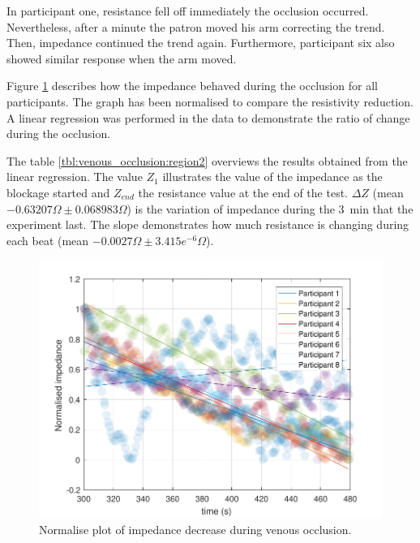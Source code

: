 In participant one, resistance fell off immediately the occlusion occurred. Nevertheless, after a minute the patron moved his arm correcting the trend. Then, impedance continued the trend again. Furthermore,  participant six also showed similar response when the arm moved. 

Figure \ref{fig:normalise:venous_occlusion} describes how the impedance behaved during the occlusion for all participants. The graph has been normalised to compare the resistivity reduction.  A linear regression was performed in the data to demonstrate the ratio of change during the occlusion.  

The table \ref{tbl:venous_occlusion:region2} overviews the results obtained from the linear regression. The value $Z_1$ illustrates the value of the impedance as the blockage started and $Z_{end}$ the resistance value at the end of the test.  $\Delta Z$ (mean $-0.63207 \Omega \pm0.068983\Omega$) is the variation of impedance during the \SI{3}{\minute} that the experiment last.  The slope demonstrates how much resistance is changing during each beat  (mean $-0.0027\Omega\pm3.415e^{-6}\Omega$). 

\begin{figure}
	\includegraphics[width=\textwidth,height=\textheight,keepaspectratio]{figure3}    
	\caption{Normalise plot of impedance decrease during venous occlusion.}
	\label{fig:normalise:venous_occlusion}
\end{figure}

